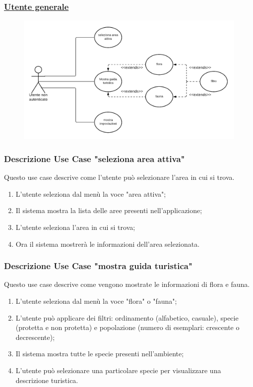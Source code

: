 \subsubsection*{\underline{\large{Utente generale}}}

\begin{figure}[ht]
    \centering
    \includegraphics[scale=0.35]{Img/Utente_non_autenticato.png}
\end{figure}

\subsubsection*{Descrizione Use Case "seleziona area attiva"}
Questo use case descrive come l'utente può selezionare l'area in cui si trova.
\begin{enumerate}
    \item L'utente seleziona dal menù la voce "area attiva";
    \item Il sistema mostra la lista delle aree presenti nell'applicazione;
    \item L'utente seleziona l'area in cui si trova;
    \item Ora il sistema mostrerà le informazioni dell'area selezionata.
\end{enumerate}

\subsubsection*{Descrizione Use Case "mostra guida turistica"}
Questo use case descrive come vengono mostrate le informazioni di flora e fauna.
\begin{enumerate}
    \item L'utente seleziona dal menù la voce "flora" o "fauna";
    \item L'utente può applicare dei filtri: ordinamento (alfabetico, casuale), specie (protetta e non protetta) e popolazione (numero di esemplari: crescente o decrescente);
    \item Il sistema mostra tutte le specie presenti nell'ambiente;
    \item L'utente può selezionare una particolare specie per visualizzare una descrizione turistica.
\end{enumerate}

